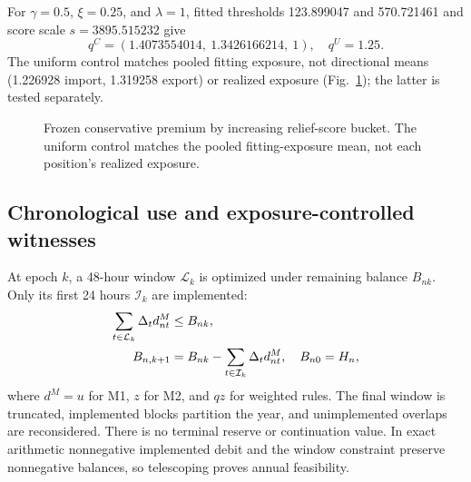 \documentclass[10pt,journal]{IEEEtran}
\begin{document}
For $\gamma=0.5$, $\xi=0.25$, and $\lambda=1$, fitted thresholds 123.899047 and 570.721461 and score scale $s=3895.515232$ give
\begin{equation}
q^C=(1.4073554014,\ 1.3426166214,\ 1),\quad q^U=1.25.
\label{eq:rates}
\end{equation}
The uniform control matches pooled fitting exposure, not directional means (1.226928 import, 1.319258 export) or realized exposure (Fig.~\ref{fig:ratecard}); the latter is tested separately.

\begin{figure}[t]
\centering
{}
\caption{Frozen conservative premium by increasing relief-score bucket. The uniform control matches the pooled fitting-exposure mean, not each position's realized exposure.}
\label{fig:ratecard}
\end{figure}




\subsection{Chronological use and exposure-controlled witnesses}
At epoch $k$, a 48-hour window $\mathcal L_k$ is optimized under remaining balance $B_{nk}$. Only its first 24 hours $\mathcal I_k$ are implemented:
\begin{align}
\sum_{t\in\mathcal L_k}\Delta_td^M_{nt}&\leq B_{nk},\notag\\
B_{n,k+1}&=B_{nk}-\sum_{t\in\mathcal I_k}\Delta_td^M_{nt},\quad B_{n0}=H_n,
\label{eq:rolling}
\end{align}
where $d^M=u$ for M1, $z$ for M2, and $qz$ for weighted rules. The final window is truncated, implemented blocks partition the year, and unimplemented overlaps are reconsidered. There is no terminal reserve or continuation value. In exact arithmetic nonnegative implemented debit and the window constraint preserve nonnegative balances, so telescoping proves annual feasibility.
\end{document}

